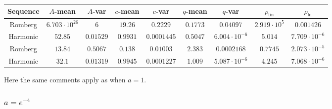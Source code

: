 \begin{table}[H]
    \centering
    \small
    \begin{tabular}{c||c|c|c|c|c|c|c|c}
Sequence & \(A\)-mean & \(A\)-var & \(c\)-mean & \(c\)-var & \(q\)-mean & \(q\)-var & \(\rho_{\operatorname{lin}}\) & \(\rho_{\ln}\)\\\hline
\rowcolor{red}
Romberg & \(6.703\cdot 10^{26}\) & \(6\) & \(19.26\) & \(0.2229\) & \(0.1773\) & \(0.04097\) & \(2.919\cdot 10^5\) & \(0.001426\) \\
\rowcolor{green}
Harmonic & \(52.85\) & \(0.01529\) & \(0.9931\) & \(0.0001445\) & \(0.5047\) & \(6.004\cdot 10^{-6}\) & \(5.014\) & \(7.709\cdot 10^{-6}\) \\
\rowcolor{green}
Romberg & \(13.84\) & \(0.5067\) & \(0.138\) & \(0.01003\) & \(2.383\) & \(0.0002168\) & \(0.7745\) & \(2.073\cdot 10^{-5}\) \\
\rowcolor{green}
Harmonic & \(32.1\) & \(0.01319\) & \(0.9945\) & \(0.0001227\) & \(1.009\) & \(5.087\cdot 10^{-6}\) & \(4.245\) & \(7.068\cdot 10^{-6}\) \\
    \end{tabular}
    \label{tab:my_label}
\end{table}

Here the same comments apply as when \(a = 1\).

\subsubsection{\(a = e^{-4}\)}

